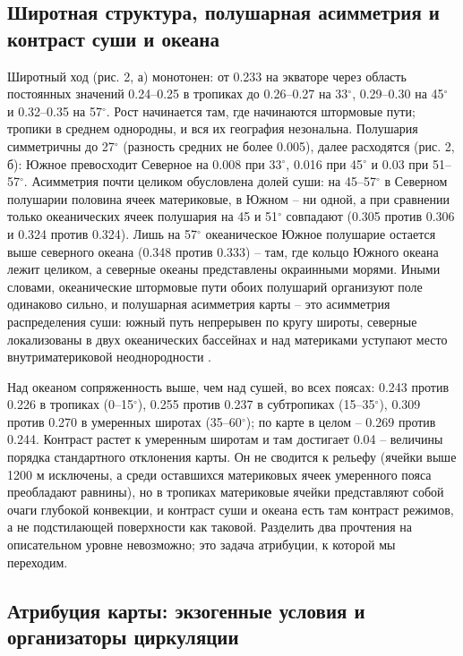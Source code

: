 \documentclass[12pt,a4paper]{article}
\begin{document}
\subsection{Широтная структура, полушарная асимметрия и контраст суши и океана}

Широтный ход (рис. 2, а) монотонен: от 0.233 на экваторе через область постоянных значений 0.24--0.25 в тропиках до 0.26--0.27 на 33$^\circ$, 0.29--0.30 на 45$^\circ$ и 0.32--0.35 на 57$^\circ$. Рост начинается там, где начинаются штормовые пути; тропики в среднем однородны, и вся их география незональна. Полушария симметричны до 27$^\circ$ (разность средних не более 0.005), далее расходятся (рис. 2, б): Южное превосходит Северное на 0.008 при 33$^\circ$, 0.016 при 45$^\circ$ и 0.03 при 51--57$^\circ$. Асимметрия почти целиком обусловлена долей суши: на 45--57$^\circ$ в Северном полушарии половина ячеек материковые, в Южном -- ни одной, а при сравнении только океанических ячеек полушария на 45 и 51$^\circ$ совпадают (0.305 против 0.306 и 0.324 против 0.324). Лишь на 57$^\circ$ океаническое Южное полушарие остается выше северного океана (0.348 против 0.333) -- там, где кольцо Южного океана лежит целиком, а северные океаны представлены окраинными морями. Иными словами, океанические штормовые пути обоих полушарий организуют поле одинаково сильно, и полушарная асимметрия карты -- это асимметрия распределения суши: южный путь непрерывен по кругу широты, северные локализованы в двух океанических бассейнах и над материками уступают место внутриматериковой неоднородности \cite{Trenberth1991,HoskinsHodges2005}.

Над океаном сопряженность выше, чем над сушей, во всех поясах: 0.243 против 0.226 в тропиках (0--15$^\circ$), 0.255 против 0.237 в субтропиках (15--35$^\circ$), 0.309 против 0.270 в умеренных широтах (35--60$^\circ$); по карте в целом -- 0.269 против 0.244. Контраст растет к умеренным широтам и там достигает 0.04 -- величины порядка стандартного отклонения карты. Он не сводится к рельефу (ячейки выше 1200 м исключены, а среди оставшихся материковых ячеек умеренного пояса преобладают равнины), но в тропиках материковые ячейки представляют собой очаги глубокой конвекции, и контраст суши и океана есть там контраст режимов, а не подстилающей поверхности как таковой. Разделить два прочтения на описательном уровне невозможно; это задача атрибуции, к которой мы переходим.

\subsection{Атрибуция карты: экзогенные условия и организаторы циркуляции}
\end{document}
